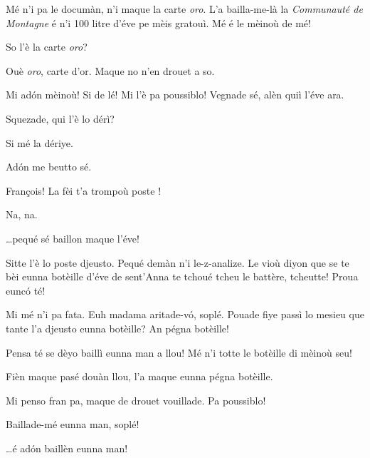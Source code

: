 \begin{drama}
\Naimaspeaks Mé n'i pa le documàn, n'i maque la carte \textit{oro}.  L'a bailla-me-là la \textit{Communauté de Montagne} é n'i 100 litre d'éve pe mèis gratouì. Mé é le mèinoù de mé!

\Prosperospeaks {} So l'è la carte \textit{oro}?

\Naimaspeaks Ouè \textit{oro}, carte d'or.  Maque no n'en drouet a so.


\Naimaspeaks {} Mi ad\'on mèinoù! Si de lé! Mi l'è pa poussiblo! Vegnade sé, alèn quiì l'éve ara.


\Francoisspeaks Squezade, qui l'è lo dérì?

\Naimaspeaks Si mé la dériye.

\Francoisspeaks{} Ad\'on me beutto sé.


\Prosperospeaks François! La fèi t'a trompoù poste !

\Francoisspeaks Na, na.

\Prosperospeaks \ldots pequé sé baillon maque l'éve!

\Francoisspeaks Sitte l'è lo poste djeusto. Pequé demàn n'i le-z-analize. Le vioù diyon que se te bèi eunna botèille d'éve de sent'Anna te tchoué tcheu le battère, tcheutte! Proua eunc\'o té!

\Prosperospeaks Mi mé n'i pa fata.  Euh madama aritade-v\'o, soplé. Pouade fiye passì lo mesieu que tante l'a djeusto eunna botèille? An pégna botèille!

\Naimaspeaks Pensa té se dèyo baillì eunna man a llou! Mé n'i totte le botèille di mèinoù seu!

\Prosperospeaks Fièn maque pasé douàn llou, l'a maque eunna pégna botèille.

\Naimaspeaks Mi penso fran pa, maque de drouet vouillade. Pa poussiblo!

\Prosperospeaks Baillade-mé eunna man, soplé!

\Naimaspeaks \ldots é ad\'on baillèn eunna man!


\end{drama}
